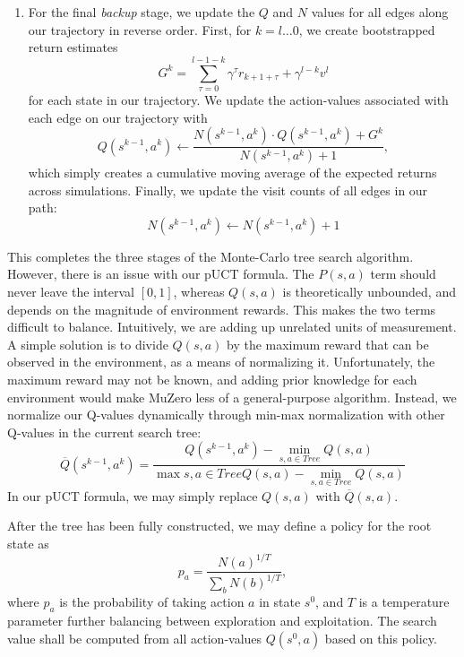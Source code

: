 \begin{enumerate}
    \item For the final \textit{backup} stage, we update the $Q$ and $N$ values for all edges along our trajectory in reverse order. First, for $k = l \dots 0$, we create bootstrapped return estimates
    \begin{equation*}
        G^k = \sum_{\tau=0}^{l - 1 - k} \gamma^\tau r_{k+1+\tau} + \gamma^{l - k} v^l
    \end{equation*}
    for each state in our trajectory. We update the action-values associated with each edge on our trajectory with
    \begin{equation*}
        Q \left(s^{k-1}, a^k\right) \leftarrow \frac{
            N \left(s^{k-1}, a^k \right) \cdot Q \left(s^{k-1}, a^k \right) + G^k
        }{
            N \left(s^{k-1}, a^k \right) + 1
        },
    \end{equation*}
    which simply creates a cumulative moving average of the expected returns across simulations. Finally, we update the visit counts of all edges in our path:
    \begin{equation*}
        N \left(s^{k-1}, a^k \right) \leftarrow  N \left(s^{k-1}, a^k \right) + 1
    \end{equation*}
\end{enumerate}

This completes the three stages of the Monte-Carlo tree search algorithm. However, there is an issue with our pUCT formula. The $P(s, a)$ term should never leave the interval $[0, 1]$, whereas $Q(s, a)$ is theoretically unbounded, and depends on the magnitude of environment rewards. This makes the two terms difficult to balance. Intuitively, we are adding up unrelated units of measurement. A simple solution is to divide $Q(s, a)$ by the maximum reward that can be observed in the environment, as a means of normalizing it. Unfortunately, the maximum reward may not be known, and adding prior knowledge for each environment would make MuZero less of a general-purpose algorithm. Instead, we normalize our Q-values dynamically through min-max normalization with other Q-values in the current search tree:
\begin{equation*}
    \overline{Q} \left(s^{k-1}, a^k\right) = \frac{
        Q \left(s^{k-1}, a^k\right) - \min_{s, a \in Tree} Q(s, a)
    }{
        \max{s, a \in Tree} Q(s, a) - \min_{s, a \in Tree} Q(s, a)
    }
\end{equation*}
In our pUCT formula, we may simply replace $Q(s, a)$ with $\overline{Q}(s, a)$.

After the tree has been fully constructed, we may define a policy for the root state as
\begin{equation*}
    p_a = \frac{N(a)^{1/T}}{\sum_b N(b)^{1/T}},
\end{equation*}
where $p_a$ is the probability of taking action $a$ in state $s^0$, and $T$ is a temperature parameter further balancing between exploration and exploitation. The search value shall be computed from all action-values $Q(s^0, a)$ based on this policy.

